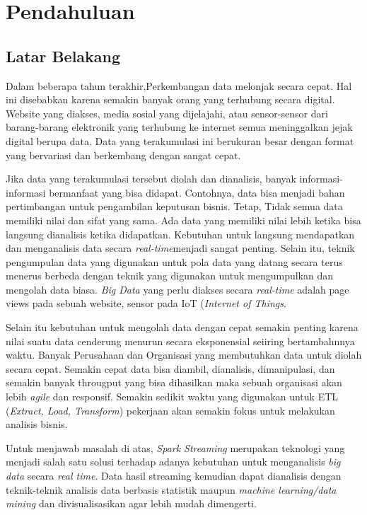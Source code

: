 \chapter{Pendahuluan}
\label{chap:intro}
   
\section{Latar Belakang}
\label{sec:label}

Dalam beberapa tahun terakhir,Perkembangan data melonjak secara cepat. Hal ini disebabkan karena semakin banyak orang yang terhubung secara digital. Website yang diakses, media sosial yang dijelajahi, atau sensor-sensor dari barang-barang elektronik yang terhubung ke internet semua meninggalkan jejak digital berupa data. Data yang terakumulasi ini berukuran besar dengan format yang bervariasi dan berkembang dengan sangat cepat.

Jika data yang terakumulasi tersebut diolah dan dianalisis, banyak informasi-informasi bermanfaat yang bisa didapat. Contohnya, data bisa menjadi bahan pertimbangan untuk pengambilan keputusan bisnis. Tetap, Tidak semua data memiliki nilai dan sifat yang sama. Ada data yang memiliki nilai lebih ketika bisa langsung dianalisis ketika didapatkan. Kebutuhan untuk langsung mendapatkan dan menganalisis data secara \textit{real-time}menjadi sangat penting. Selain itu, teknik pengumpulan data yang digunakan untuk pola data yang datang secara terus menerus berbeda dengan teknik yang digunakan untuk mengumpulkan dan mengolah data biasa. \textit{Big Data} yang perlu diakses secara \textit{real-time} adalah page views pada sebuah website, sensor pada IoT (\textit{Internet of Things}.

Selain itu kebutuhan untuk mengolah data dengan cepat semakin penting karena nilai suatu data cenderung menurun secara eksponensial seiiring bertambahnnya waktu. Banyak Perusahaan dan Organisasi yang membutuhkan data untuk diolah secara cepat. Semakin cepat data bisa diambil, dianalisis, dimanipulasi, dan semakin banyak througput yang bisa dihasilkan maka sebuah organisasi akan lebih \textit{agile} dan responsif. Semakin sedikit waktu yang digunakan untuk ETL (\textit{Extract, Load, Transform}) pekerjaan akan semakin fokus untuk melakukan analisis bisnis.

Untuk menjawab masalah di atas, \textit{Spark Streaming} merupakan teknologi yang menjadi salah satu solusi terhadap adanya kebutuhan untuk menganalisis \textit{big data} secara \textit{real time}. Data hasil streaming kemudian dapat dianalisis dengan teknik-teknik analisis data berbasis statistik maupun \textit{machine learning/data mining} dan divisualisasikan agar lebih mudah dimengerti.


